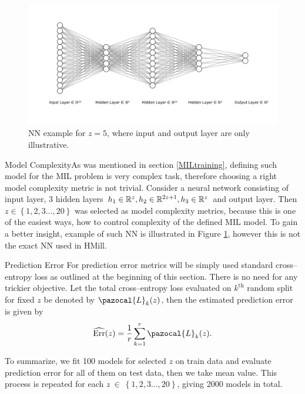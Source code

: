 \begin{figure}[h]
	\centering
	\includegraphics[width=16.0cm, trim={4cm 4.0cm 0.5cm 3.5cm},clip]{plots/Images/nn.pdf}
	\caption{NN example for $z=5$, where input and output layer are only illustrative.}
	\label{NN}
\end{figure}

\begin{para}{Model Complexity}As was mentioned in section \ref{MILtraining}, defining such model for the MIL problem is very complex task, therefore choosing a right model complexity metric is not trivial. Consider a neural network consisting of input layer, 3 hidden layers $h_1\in \mathbb{R}^z, h_2\in \mathbb{R}^{2z+1}, h_3\in \mathbb{R}^z$ and output layer. Then $z \in \left\{1,2,3\dots,20 \right\}$ was selected as model complexity metrics, because this is one of the easiest ways, how to control complexity of the defined MIL model. To gain a better insight, example of such NN is illustrated in Figure \ref{NN}, however this is not the exact NN used in HMill.
\end{para}     

\begin{para}{Prediction Error}
For prediction error metrics will be simply used standard cross--entropy loss  as outlined at the beginning of this section.  There is no need for any trickier objective. Let the total cross--entropy loss evaluated on $k^{\mathrm{th}}$ random split for fixed $z$ be denoted by $\pazocal{L}_k(z)$, then the estimated prediction error is given by 
\begin{equation}
	\widehat{\mathrm{Err}}(z) = \frac{1}{r}\sum_{k=1}^r \pazocal{L}_k(z).
\end{equation}
\end{para}
\vspace{1cm}

To summarize,  we fit 100 models for selected $z$ on train data and evaluate prediction error for all of them on test data, then we take mean value. This process is repeated for each $z~\in~\left\{1,2,3\dots,20 \right\}$, giving 2000 models in total. 
